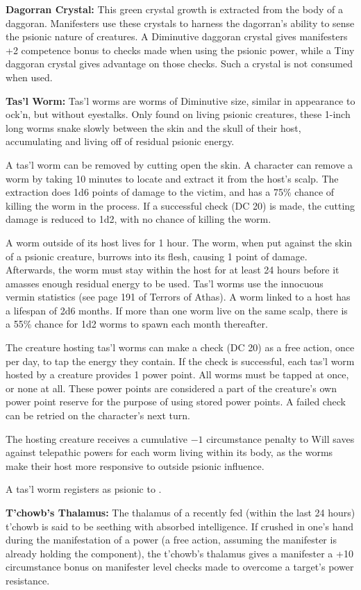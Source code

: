 \textbf{Dagorran Crystal:} This green crystal growth is extracted from the body of a daggoran. Manifesters use these crystals to harness the dagorran's ability to sense the psionic nature of creatures. A Diminutive daggoran crystal gives manifesters +2 competence bonus to  checks made when using the  psionic power, while a Tiny daggoran crystal gives advantage on those checks. Such a crystal is not consumed when used.

\textbf{Tas'l Worm:} Tas'l worms are worms of Diminutive size, similar in appearance to ock'n, but without eyestalks. Only found on living psionic creatures, these 1-inch long worms snake slowly between the skin and the skull of their host, accumulating and living off of residual psionic energy.

A tas'l worm can be removed by cutting open the skin. A character can remove a worm by taking 10 minutes to locate and extract it from the host's scalp. The extraction does 1d6 points of damage to the victim, and has a 75\% chance of killing the worm in the process. If a successful  check (DC 20) is made, the cutting damage is reduced to 1d2, with no chance of killing the worm.

A worm outside of its host lives for 1 hour. The worm, when put against the skin of a psionic creature, burrows into its flesh, causing 1 point of damage. Afterwards, the worm must stay within the host for at least 24 hours before it amasses enough residual energy to be used. Tas'l worms use the innocuous vermin statistics (see page 191 of Terrors of Athas). A worm linked to a host has a lifespan of 2d6 months. If more than one worm live on the same scalp, there is a 55\% chance for 1d2 worms to spawn each month thereafter.

The creature hosting tas'l worms can make a  check (DC 20) as a free action, once per day, to tap the energy they contain. If the check is successful, each tas'l worm hosted by a creature provides 1 power point. All worms must be tapped at once, or none at all. These power points are considered a part of the creature's own power point reserve for the purpose of using stored power points. A failed check can be retried on the character's next turn.

The hosting creature receives a cumulative $-1$ circumstance penalty to Will saves against telepathic powers for each worm living within its body, as the worms make their host more responsive to outside psionic influence.

A tas'l worm registers as psionic to .

\textbf{T'chowb's Thalamus:} The thalamus of a recently fed (within the last 24 hours) t'chowb is said to be seething with absorbed intelligence. If crushed in one's hand during the manifestation of a power (a free action, assuming the manifester is already holding the component), the t'chowb's thalamus gives a manifester a +10 circumstance bonus on manifester level checks made to overcome a target's power resistance.